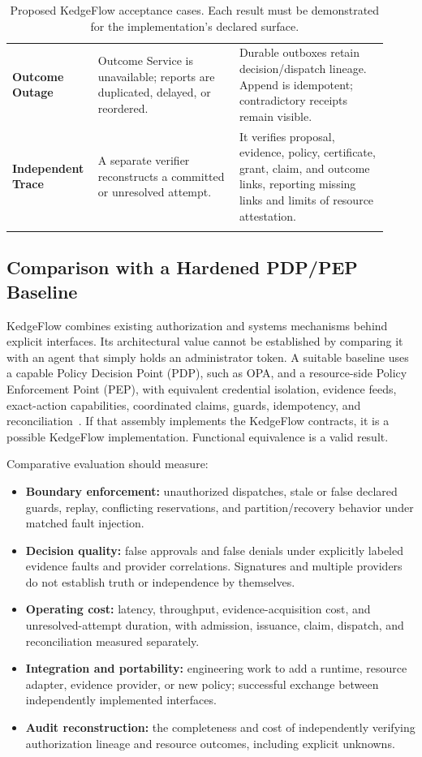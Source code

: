 \begin{longtable}{L{0.18\linewidth}L{0.36\linewidth}L{0.38\linewidth}}
\textbf{Outcome Outage} & Outcome Service is unavailable; reports are duplicated, delayed, or reordered. & Durable outboxes retain decision/dispatch lineage. Append is idempotent; contradictory receipts remain visible.\\
\textbf{Independent Trace} & A separate verifier reconstructs a committed or unresolved attempt. & It verifies proposal, evidence, policy, certificate, grant, claim, and outcome links, reporting missing links and limits of resource attestation.\\
\bottomrule
\caption{Proposed KedgeFlow acceptance cases. Each result must be demonstrated for the implementation's declared surface.}
\label{tab:acceptance-matrix}
\end{longtable}
\normalsize

\subsection{Comparison with a Hardened PDP/PEP Baseline}
\label{sec:comparative-protocol}

KedgeFlow combines existing authorization and systems mechanisms behind explicit interfaces. Its architectural value cannot be established by comparing it with an agent that simply holds an administrator token. A suitable baseline uses a capable Policy Decision Point (PDP), such as OPA, and a resource-side Policy Enforcement Point (PEP), with equivalent credential isolation, evidence feeds, exact-action capabilities, coordinated claims, guards, idempotency, and reconciliation~\cite{nist800207,opa}. If that assembly implements the KedgeFlow contracts, it is a possible KedgeFlow implementation. Functional equivalence is a valid result.

Comparative evaluation should measure:
\begin{itemize}
\item \textbf{Boundary enforcement:} unauthorized dispatches, stale or false declared guards, replay, conflicting reservations, and partition/recovery behavior under matched fault injection.
\item \textbf{Decision quality:} false approvals and false denials under explicitly labeled evidence faults and provider correlations. Signatures and multiple providers do not establish truth or independence by themselves.
\item \textbf{Operating cost:} latency, throughput, evidence-acquisition cost, and unresolved-attempt duration, with admission, issuance, claim, dispatch, and reconciliation measured separately.
\item \textbf{Integration and portability:} engineering work to add a runtime, resource adapter, evidence provider, or new policy; successful exchange between independently implemented interfaces.
\item \textbf{Audit reconstruction:} the completeness and cost of independently verifying authorization lineage and resource outcomes, including explicit unknowns.
\end{itemize}

